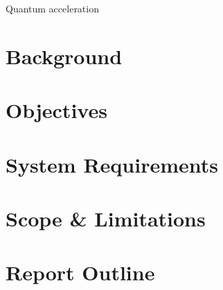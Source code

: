 \documentclass[class=report,11pt,crop=false]{standalone}
\begin{document}
Quantum acceleration




\section{Background}
\lipsum[1]

\section{Objectives}
\lipsum[1]

\section{System Requirements}
\lipsum[1]

\section{Scope \& Limitations}
\lipsum[1]

\section{Report Outline}
\lipsum[1]

\ifstandalone

\printnoidxglossary[type=\acronymtype,nonumberlist]
\fi
\end{document}
